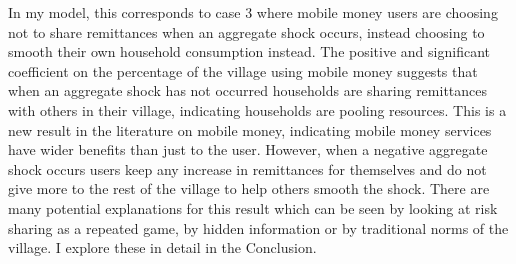 In my model, this corresponds to case 3 where mobile money users are choosing not to share remittances when an aggregate shock occurs, instead choosing to smooth their own household consumption instead. The positive and significant coefficient on the percentage of the village using mobile money suggests that when an aggregate shock has not occurred households are sharing remittances with others in their village, indicating households are pooling resources. This is a new result in the literature on mobile money, indicating mobile money services have wider benefits than just to the user. However, when a negative aggregate shock occurs users keep any increase in remittances for themselves and do not give more to the rest of the village to help others smooth the shock. There are many potential explanations for this result which can be seen by looking at risk sharing as a repeated game, by hidden information or by traditional norms of the village. I explore these in detail in the Conclusion.   

